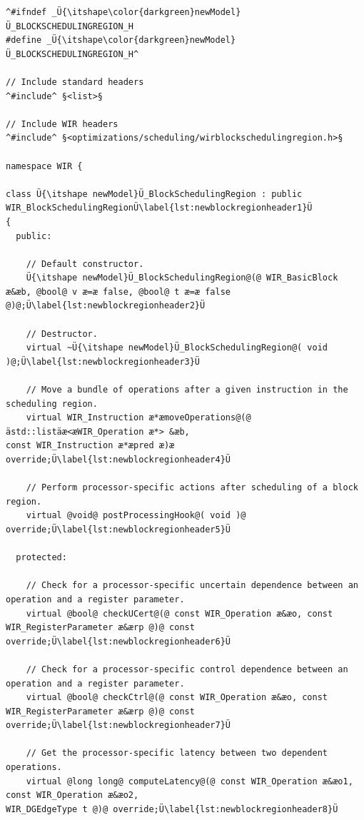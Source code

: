 \begin{lstlisting}[style=code,float=!ht,caption={Header File for a New Processor Model's Block Scheduling Region},label=lst:newblockregionheader]
^#ifndef _Ü{\itshape\color{darkgreen}newModel}Ü_BLOCKSCHEDULINGREGION_H
#define _Ü{\itshape\color{darkgreen}newModel}Ü_BLOCKSCHEDULINGREGION_H^

// Include standard headers
^#include^ §<list>§

// Include WIR headers
^#include^ §<optimizations/scheduling/wirblockschedulingregion.h>§

namespace WIR {

class Ü{\itshape newModel}Ü_BlockSchedulingRegion : public WIR_BlockSchedulingRegionÜ\label{lst:newblockregionheader1}Ü
{
  public:

    // Default constructor.
    Ü{\itshape newModel}Ü_BlockSchedulingRegion@(@ WIR_BasicBlock æ&æb, @bool@ v æ=æ false, @bool@ t æ=æ false @)@;Ü\label{lst:newblockregionheader2}Ü

    // Destructor.
    virtual ~Ü{\itshape newModel}Ü_BlockSchedulingRegion@( void )@;Ü\label{lst:newblockregionheader3}Ü

    // Move a bundle of operations after a given instruction in the scheduling region.
    virtual WIR_Instruction æ*æmoveOperations@(@ ästd::listäæ<æWIR_Operation æ*> &æb,                                                                            const WIR_Instruction æ*æpred æ)æ override;Ü\label{lst:newblockregionheader4}Ü

    // Perform processor-specific actions after scheduling of a block region.
    virtual @void@ postProcessingHook@( void )@ override;Ü\label{lst:newblockregionheader5}Ü

  protected:

    // Check for a processor-specific uncertain dependence between an operation and a register parameter.
    virtual @bool@ checkUCert@(@ const WIR_Operation æ&æo, const WIR_RegisterParameter æ&ærp @)@ const override;Ü\label{lst:newblockregionheader6}Ü

    // Check for a processor-specific control dependence between an operation and a register parameter.
    virtual @bool@ checkCtrl@(@ const WIR_Operation æ&æo, const WIR_RegisterParameter æ&ærp @)@ const override;Ü\label{lst:newblockregionheader7}Ü

    // Get the processor-specific latency between two dependent operations.
    virtual @long long@ computeLatency@(@ const WIR_Operation æ&æo1, const WIR_Operation æ&æo2,                                                         WIR_DGEdgeType t @)@ override;Ü\label{lst:newblockregionheader8}Ü


\end{lstlisting}
